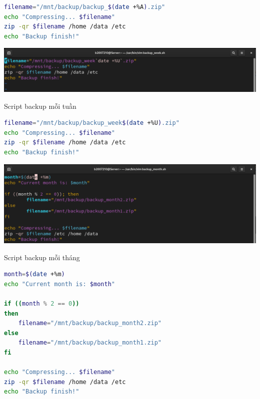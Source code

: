 \documentclass[a4paper, 11pt]{article}
\begin{document}
\begin{lstlisting}[language=bash, caption={Script backup mỗi ngày}]
filename="/mnt/backup/backup_$(date +%A).zip"
echo "Compressing... $filename"
zip -qr $filename /home /data /etc
echo "Backup finish!"
\end{lstlisting}


\begin{minipage}
    {\linewidth}
    \captionsetup{type=figure}
    \centering
    \includegraphics[width=\linewidth]{images/backup-week.png}
    \caption{Script backup mỗi tuần}
    \label{figure:backup-week}
\end{minipage}

\begin{lstlisting}[language=bash, caption={Script backup mỗi tuần}]
filename="/mnt/backup/backup_week$(date +%U).zip"
echo "Compressing... $filename"
zip -qr $filename /home /data /etc
echo "Backup finish!"
\end{lstlisting}

\begin{minipage}
    {\linewidth}
    \captionsetup{type=figure}
    \centering
    \includegraphics[width=\linewidth]{images/backup-month.png}
    \caption{Script backup mỗi tháng}
    \label{figure:backup-month}
\end{minipage}

\begin{lstlisting}[language=bash, caption={Script backup mỗi tháng}]
month=$(date +%m)
echo "Current month is: $month"

if ((month % 2 == 0))
then
    filename="/mnt/backup/backup_month2.zip"
else
    filename="/mnt/backup/backup_month1.zip"
fi

echo "Compressing... $filename"
zip -qr $filename /home /data /etc
echo "Backup finish!"
\end{lstlisting}
\end{document}
